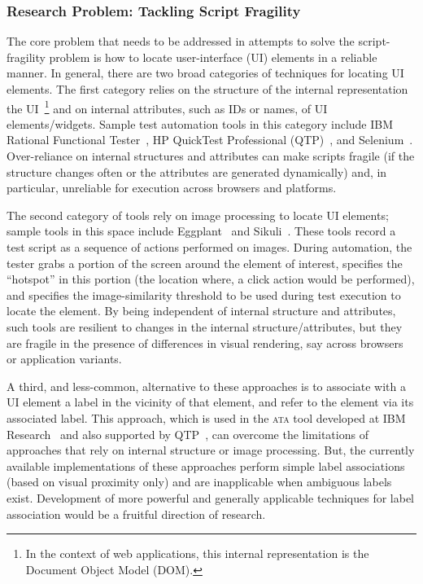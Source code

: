 \subsubsection*{Research Problem: Tackling Script Fragility}

The core problem that needs to be addressed in attempts to solve the
script-fragility problem is how to locate user-interface (UI) elements in a
reliable manner. In general, there are two broad categories of techniques for
locating UI elements. The first category relies on the structure of the internal
representation the UI~\footnote{\small In the context of web applications, this
  internal representation is the Document Object Model (DOM).} and on internal
attributes, such as IDs or names, of UI elements/widgets. Sample test automation
tools in this category include IBM Rational Functional Tester~\cite{ibmrft}, HP
QuickTest Professional (QTP)~\cite{hpqtp}, and
Selenium~\cite{selenium}. Over-reliance on internal structures and attributes
can make scripts fragile (\eg if the structure changes often or the attributes
are generated dynamically) and, in particular, unreliable for execution across
browsers and platforms.

The second category of tools rely on image processing to locate UI elements;
sample tools in this space include Eggplant~\cite{Eggplant} and
Sikuli~\cite{Chang:2010, Yeh:2009}. These tools record a test script as a
sequence of actions performed on images. During automation, the tester grabs a
portion of the screen around the element of interest, specifies the ``hotspot''
in this portion (the location where, \eg a click action would be performed), and
specifies the image-similarity threshold to be used during test execution to
locate the element. By being independent of internal structure and attributes,
such tools are resilient to changes in the internal structure/attributes, but
they are fragile in the presence of differences in visual rendering, say across
browsers or application variants.

A third, and less-common, alternative to these approaches is to associate with a
UI element a label in the vicinity of that element, and refer to the element via
its associated label. This approach, which is used in the \textsc{ata} tool
developed at IBM Research~\cite{thummalapenta:2012b, thummalapenta:2012a,
  thummalapenta:2013a} and also supported by QTP~\cite{hpqtp}, can overcome the
limitations of approaches that rely on internal structure or image
processing. But, the currently available implementations of these approaches
perform simple label associations (based on visual proximity only) and are
inapplicable when ambiguous labels exist. Development of more powerful and
generally applicable techniques for label association would be a fruitful
direction of research.

